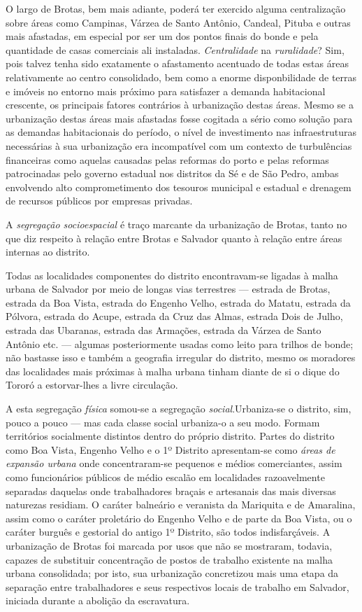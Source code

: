 O largo de Brotas, bem mais adiante, poderá ter exercido alguma centralização sobre áreas como Campinas, Várzea de Santo Antônio, Candeal, Pituba e outras mais afastadas, em especial por ser um dos pontos finais do bonde e pela quantidade de casas comerciais ali instaladas. \textit{Centralidade} na \textit{ruralidade}? Sim, pois talvez tenha sido exatamente o afastamento acentuado de todas estas áreas relativamente ao centro consolidado, bem como a enorme disponbilidade de terras e imóveis no entorno mais próximo para satisfazer a demanda habitacional crescente, os principais fatores contrários à urbanização destas áreas. Mesmo se a urbanização destas áreas mais afastadas fosse cogitada a sério como solução para as demandas habitacionais do período, o nível de investimento nas infraestruturas necessárias à sua urbanização era incompatível com um contexto de turbulências financeiras como aquelas causadas pelas reformas do porto e pelas reformas patrocinadas pelo governo estadual nos distritos da Sé e de São Pedro, ambas envolvendo alto comprometimento dos tesouros municipal e estadual e drenagem de recursos públicos por empresas privadas.

A \textit{segregação socioespacial} é traço marcante da urbanização de Brotas, tanto no que diz respeito à relação entre Brotas e Salvador quanto à relação entre áreas internas ao distrito. 

Todas as localidades componentes do distrito encontravam-se ligadas à malha urbana de Salvador por meio de longas vias terrestres --- estrada de Brotas, estrada da Boa Vista, estrada do Engenho Velho, estrada do Matatu, estrada da Pólvora, estrada do Acupe, estrada da Cruz das Almas, estrada Dois de Julho, estrada das Ubaranas, estrada das Armações, estrada da Várzea de Santo Antônio etc. --- algumas posteriormente usadas como leito para trilhos de bonde; não bastasse isso e também a geografia irregular do distrito, mesmo os moradores das localidades mais próximas à malha urbana tinham diante de si o dique do Tororó a estorvar-lhes a livre circulação. 

A esta segregação \textit{física} somou-se a segregação \textit{social}.Urbaniza-se o distrito, sim, pouco a pouco --- mas cada classe social urbaniza-o a seu modo. Formam territórios socialmente distintos dentro do próprio distrito. Partes do distrito como Boa Vista, Engenho Velho e o 1º Distrito apresentam-se como \textit{áreas de expansão urbana} onde concentraram-se pequenos e médios comerciantes, assim como funcionários públicos de médio escalão em localidades razoavelmente separadas daquelas onde trabalhadores braçais e artesanais das mais diversas naturezas residiam. O caráter balneário e veranista da Mariquita e de Amaralina, assim como o caráter proletário do Engenho Velho e de parte da Boa Vista, ou o caráter burguês e gestorial do antigo 1º Distrito, são todos indisfarçáveis. A urbanização de Brotas foi marcada por usos que não se mostraram, todavia, capazes de substituir concentração de postos de trabalho existente na malha urbana consolidada; por isto, sua urbanização concretizou mais uma etapa da separação entre trabalhadores e seus respectivos locais de trabalho em Salvador, iniciada durante a abolição da escravatura. 

